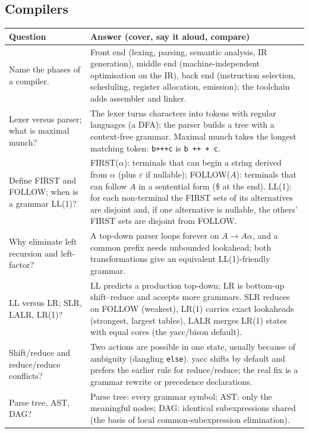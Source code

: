 \documentclass[10pt,a4paper,openany,oneside]{report}
\begin{document}
\subsection{Compilers}
\begin{center}\small
\begin{xltabular}{\textwidth}{@{}L{4.6cm}Y@{}}
\toprule
\textbf{Question} & \textbf{Answer (cover, say it aloud, compare)}\\
\midrule\endhead
Name the phases of a compiler. & Front end (lexing, parsing, semantic analysis, IR generation), middle end (machine-independent optimisation on the IR), back end (instruction selection, scheduling, register allocation, emission); the toolchain adds assembler and linker.\\
Lexer versus parser; what is maximal munch? & The lexer turns characters into tokens with regular languages (a DFA); the parser builds a tree with a context-free grammar. Maximal munch takes the longest matching token: \texttt{b+++c} is \texttt{b ++ + c}.\\
Define FIRST and FOLLOW; when is a grammar LL(1)? & FIRST($\alpha$): terminals that can begin a string derived from $\alpha$ (plus $\varepsilon$ if nullable); FOLLOW($A$): terminals that can follow $A$ in a sentential form (\$ at the end). LL(1): for each non-terminal the FIRST sets of its alternatives are disjoint and, if one alternative is nullable, the others' FIRST sets are disjoint from FOLLOW.\\
Why eliminate left recursion and left-factor? & A top-down parser loops forever on $A\to A\alpha$, and a common prefix needs unbounded lookahead; both transformations give an equivalent LL(1)-friendly grammar.\\
LL versus LR; SLR, LALR, LR(1)? & LL predicts a production top-down; LR is bottom-up shift--reduce and accepts more grammars. SLR reduces on FOLLOW (weakest), LR(1) carries exact lookaheads (strongest, largest tables), LALR merges LR(1) states with equal cores (the yacc/bison default).\\
Shift/reduce and reduce/reduce conflicts? & Two actions are possible in one state, usually because of ambiguity (dangling \texttt{else}). yacc shifts by default and prefers the earlier rule for reduce/reduce; the real fix is a grammar rewrite or precedence declarations.\\
Parse tree, AST, DAG? & Parse tree: every grammar symbol; AST: only the meaningful nodes; DAG: identical subexpressions shared (the basis of local common-subexpression elimination).\\

\end{xltabular}
\end{center}
\end{document}
